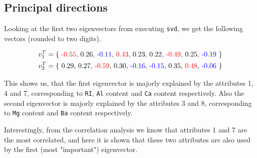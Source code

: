 \subsection{Principal directions}

Looking at the first two eigenvectors from executing \texttt{svd}, we get the following vectors (rounded to two digits). 


\begin{gather*}
    v_1^T = \{\text{ \textcolor{red}{-0.55}, 0.26, \textcolor{blue}{-0.11}, \textcolor{red}{0.43}, 0.23, 0.22, \textcolor{red}{-0.49}, 0.25, \textcolor{blue}{-0.19} }\} \\
  v_2^T = \{\text{ 0.29, 0.27, \textcolor{red}{-0.59}, 0.30, \textcolor{blue}{-0.16}, \textcolor{blue}{-0.15}, 0.35, \textcolor{red}{0.48}, \textcolor{blue}{-0.06} }\}
\end{gather*}


This shows us, that the first eigenvector is majorly explained by the attributes 1, 4 and 7, corresponding to \texttt{RI}, \texttt{Al} content and \texttt{Ca} content respectively. Also the second eigenvector is majorly explained by the attributes 3 and 8, corresponding to \texttt{Mg} content and \texttt{Ba} content respectively. \newline

Interestingly, from the correlation analysis we know that attributes 1 and 7 are the most correlated, and here it is shown that these two attributes are also used by the first (most "important") eigenvector.